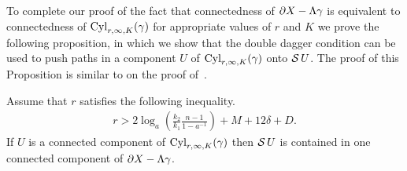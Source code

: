 To complete our proof of the fact that connectedness of $\partial X - \Lambda\gamma$ is equivalent to connectedness of $\operatorname{Cyl}_{r, \infty, K}(\gamma)$ for appropriate values of $r$ and $K$ we prove the following proposition, in which we show that the double dagger condition can be used to push paths in a component $U$ of $\operatorname{Cyl}_{r, \infty, K}(\gamma)$ onto $\operatorname{\mathcal{S}} U$.
The proof of this Proposition is similar to on the proof of~\cite[Proposition 3.2]{bestvinamess91}.

\begin{proposition}\label{proposition:shadows_connected} 
  Assume that $r$ satisfies the following inequality.
  \begin{align}
    r > 2\log_a\left(\frac{k_2}{k_1}\frac{n-1}{1-a^{-1}}\right) + M + 12\delta + D.
  \end{align}
  If $U$ is a connected component of $\operatorname{Cyl}_{r, \infty, K}(\gamma)$ then $\operatorname{\mathcal{S}} U$ is contained in one connected component of $\partial X - \Lambda \gamma$.
\end{proposition}

